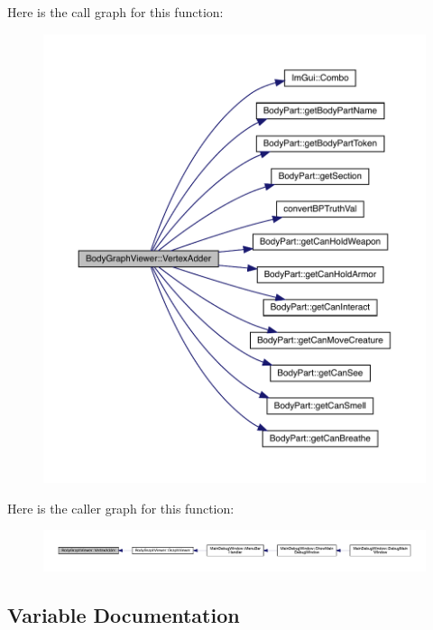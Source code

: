 Here is the call graph for this function\+:
\nopagebreak
\begin{figure}[H]
\begin{center}
\leavevmode
\includegraphics[width=350pt]{df/d9e/namespace_body_graph_viewer_a84ae9cb3a7a4441cd2f55037b98ddcaf_cgraph}
\end{center}
\end{figure}
Here is the caller graph for this function\+:
\nopagebreak
\begin{figure}[H]
\begin{center}
\leavevmode
\includegraphics[width=350pt]{df/d9e/namespace_body_graph_viewer_a84ae9cb3a7a4441cd2f55037b98ddcaf_icgraph}
\end{center}
\end{figure}


\subsection{Variable Documentation}
\mbox{\label{namespace_body_graph_viewer_a3ec477169bc8a7b40f921786efd06606}} 
